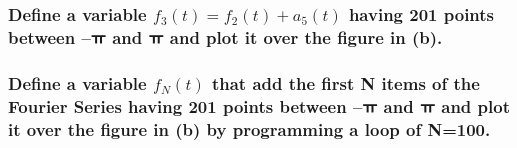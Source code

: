 \documentclass[12pt,a4paper]{article}
\begin{document}
\subsubsection{Define a variable $f_3(t)=f_2(t)+a_5(t) $   having 201 points between –ㅠ and ㅠ and plot it over the figure in (b).}
\subsubsection{Define a variable    $f_N(t)$   that add the first N items of the Fourier Series having 201 points between –ㅠ and ㅠ and plot it over the figure in (b) by programming a loop of N=100.}
\end{document}

